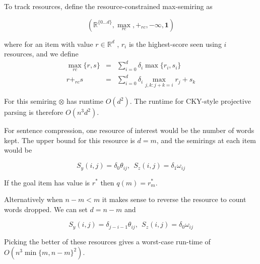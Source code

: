 \documentclass[11pt]{article}
\newcommand{\Reals}{\mathbb{R}}
\newcommand{\rtrap}{\scalebox{0.2}{\tikz{
    \coordinate (A) at (0,0);
    \coordinate (B) at (90:1.5cm);
    \coordinate (C) at (2.5,0.9cm);
    \coordinate (D) at (0:2.5cm);
    \draw[line width = 0.05cm] (A)--(B)--(C)--(D)--cycle;
    }}}
\newcommand{\rtri}{\scalebox{0.2}{\tikz{
    \coordinate (A) at (0,0);
    \coordinate (B) at (90:1.5cm);
    \coordinate (C) at (180:-1.7cm);
    \draw[line width = 0.05cm] (A)--(B)--(C)--cycle;
    }}}
\begin{document}
To track resources, define the resource-constrained max-semiring as 

\[(\Reals^{\{0\ldots d\}}, \max_{rc}, +_{rc}, -\mathbf{\infty}, \mathbf{1})\]

\noindent where for an item with value $r \in \Reals^d$ , $r_i$ is the
highest-score seen using $i$ resources, and we define
\begin{eqnarray*}
 \max_{rc} \{r, s\} &=& \sum_{i = 0}^d \delta_i \max \{r_i, s_i\}  \\
 r +_{rc} s &=& \sum_{i = 0}^d \delta_i  \max_{j ,k: j+k =i}  r_j + s_k   
\end{eqnarray*}


For this semiring $\otimes$ has runtime $O(d^2)$. The runtime for CKY-style
projective parsing is therefore $O(n^3d^2)$.


For sentence compression, one resource of interest would be the number of 
words kept. The upper bound for this resource is $d=m$, and the semirings 
at each item would be

\[ S_y(i,j) = \delta_0  \theta_{ij} , \ \  S_z(i,j) = \delta_1 \omega_{ij}  \]

If the goal item has value is $r^*$ then $q(m) = r^*_m$.

Alternatively when $n - m < m$ it makes sense to reverse the resource to 
count words dropped. We can set $d = n - m$ and 

\[S_y(i,j) = \delta_{j-i-1}  \theta_{ij} ,\ \   S_z(i,j) = \delta_0 \omega_{ij}    \]

Picking the better of these resources gives a worst-case run-time of $O(n^3\min\{m,n-m\}^2)$. 






\end{document}
